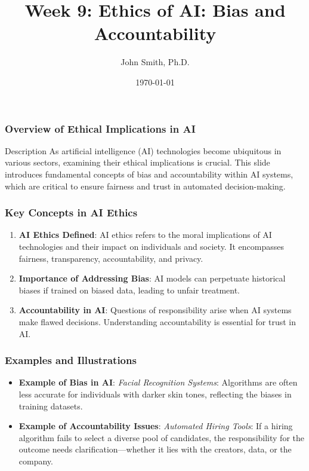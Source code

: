 \documentclass[aspectratio=169]{beamer}
\title[Week 9: Ethics of AI]{Week 9: Ethics of AI: Bias and Accountability}
\author[J. Smith]{John Smith, Ph.D.}
\institute[University Name]{
  Department of Computer Science\\
  University Name\\
  \vspace{0.3cm}
  Email: email@university.edu\\
  Website: www.university.edu
}
\date{\today}
\begin{document}
\frame{\titlepage}

\begin{frame}[fragile]
    \titlepage
\end{frame}

\begin{frame}[fragile]
    \frametitle{Overview of Ethical Implications in AI}
    \begin{block}{Description}
        As artificial intelligence (AI) technologies become ubiquitous in various sectors, examining their ethical implications is crucial. This slide introduces fundamental concepts of bias and accountability within AI systems, which are critical to ensure fairness and trust in automated decision-making.
    \end{block}
\end{frame}

\begin{frame}[fragile]
    \frametitle{Key Concepts in AI Ethics}
    \begin{enumerate}
        \item \textbf{AI Ethics Defined}: 
        AI ethics refers to the moral implications of AI technologies and their impact on individuals and society. It encompasses fairness, transparency, accountability, and privacy.
        
        \item \textbf{Importance of Addressing Bias}:
        AI models can perpetuate historical biases if trained on biased data, leading to unfair treatment.
        
        \item \textbf{Accountability in AI}:
        Questions of responsibility arise when AI systems make flawed decisions. Understanding accountability is essential for trust in AI.
    \end{enumerate}
\end{frame}

\begin{frame}[fragile]
    \frametitle{Examples and Illustrations}
    \begin{itemize}
        \item \textbf{Example of Bias in AI}:
        \textit{Facial Recognition Systems}: Algorithms are often less accurate for individuals with darker skin tones, reflecting the biases in training datasets.
        
        \item \textbf{Example of Accountability Issues}:
        \textit{Automated Hiring Tools}: If a hiring algorithm fails to select a diverse pool of candidates, the responsibility for the outcome needs clarification—whether it lies with the creators, data, or the company.
    \end{itemize}
\end{frame}
\end{document}
